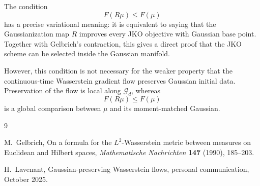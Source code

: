 \documentclass[11pt]{article}
\begin{document}
The condition
\[
F(R\mu)\le F(\mu)
\]
has a precise variational meaning: it is equivalent to saying that the
Gaussianization map $R$ improves every JKO objective with Gaussian base point.
Together with Gelbrich's contraction, this gives a direct proof that the JKO
scheme can be selected inside the Gaussian manifold.

However, this condition is not necessary for the weaker property that the
continuous-time Wasserstein gradient flow preserves Gaussian initial data.
Preservation of the flow is local along $\mathcal G_d$, whereas
\[
F(R\mu)\le F(\mu)
\]
is a global comparison between $\mu$ and its moment-matched Gaussian.

\begin{thebibliography}{9}

M.~Gelbrich,
\newblock On a formula for the $L^2$-Wasserstein metric between measures on
Euclidean and Hilbert spaces,
\newblock \emph{Mathematische Nachrichten} \textbf{147} (1990), 185--203.

H.~Lavenant,
\newblock Gaussian-preserving Wasserstein flows,
\newblock personal communication, October 2025.

\end{thebibliography}
\end{document}
